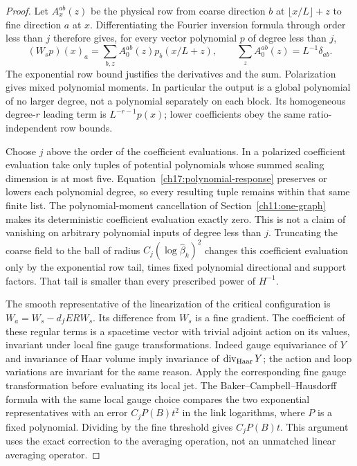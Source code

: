 \begin{proof}
Let $A_x^{ab}(z)$ be the physical row from coarse direction $b$ at
$\lfloor x/L\rfloor+z$ to fine direction $a$ at $x$.
Differentiating the Fourier inversion formula through order less than $j$
therefore gives, for every vector polynomial $p$ of degree less than $j$,
\begin{equation}\label{ch17:polynomial-response}
 (W_sp)(x)_a=\sum_{b,z}A_0^{ab}(z)p_b(x/L+z),
 \qquad \sum_z A_0^{ab}(z)=L^{-1}\delta_{ab}.
\end{equation}
The exponential row bound justifies the derivatives and the sum.
Polarization gives mixed polynomial moments. In particular the output
is a global polynomial of no larger degree, not a polynomial separately
on each block. Its homogeneous degree-$r$ leading term is
$L^{-r-1}p(x)$; lower coefficients obey the same ratio-independent row bounds.

Choose $j$ above the order of the coefficient evaluations. In a polarized coefficient
evaluation take only tuples of potential polynomials whose summed scaling
dimension is at most five. Equation~\eqref{ch17:polynomial-response}
preserves or lowers each polynomial degree, so every resulting tuple
remains within that same finite list. The polynomial-moment
cancellation of Section~\ref{ch11:one-graph} makes its deterministic
coefficient evaluation exactly zero. This is not a claim of vanishing on arbitrary
polynomial inputs of degree less than $j$. Truncating the coarse field to the ball of radius
$C_j(\log\widehat\beta_k)^2$ changes this coefficient evaluation only by the
exponential row tail, times fixed polynomial directional and support
factors. That tail is smaller than every prescribed power of $H^{-1}$.

The smooth representative of the linearization of the critical configuration is
$W_a=W_s-d_fERW_s$. Its difference from $W_s$ is a fine gradient.
The coefficient of these regular terms is a spacetime vector with trivial adjoint action on its values,
invariant under local fine gauge transformations. Indeed gauge
equivariance of $Y$ and invariance of Haar volume imply invariance of
$\operatorname{div}_{\rm Haar}Y$; the action and loop variations
are invariant for the same reason. Apply the corresponding fine gauge
transformation before evaluating its local jet. The Baker--Campbell--Hausdorff formula with the same local gauge choice compares the two exponential
representatives with an error $C_jP(B)t^2$ in the link logarithms,
where $P$ is a fixed polynomial. Dividing by the fine threshold gives
$C_jP(B)t$. This argument uses the exact correction to the averaging operation, not an
unmatched linear averaging operator.


\end{proof}
